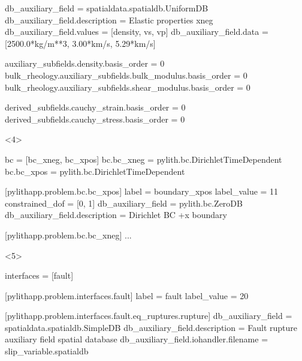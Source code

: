\documentclass[aspectratio=169]{beamer}
\begin{document}
\begin{frame}[t,fragile]
\begin{minipage}[t]{0.60\textwidth}
\begin{onlyenv}
\begin{cfgcode}
        db_auxiliary_field = spatialdata.spatialdb.UniformDB
        db_auxiliary_field.description = Elastic properties xneg
        db_auxiliary_field.values = [density, vs, vp]
        db_auxiliary_field.data = [2500.0*kg/m**3, 3.00*km/s, 5.29*km/s]

        auxiliary_subfields.density.basis_order = 0
        bulk_rheology.auxiliary_subfields.bulk_modulus.basis_order = 0
        bulk_rheology.auxiliary_subfields.shear_modulus.basis_order = 0

        derived_subfields.cauchy_strain.basis_order = 0
        derived_subfields.cauchy_stress.basis_order = 0
      \end{cfgcode}
    \end{onlyenv}
    \begin{onlyenv}<4>
      \begin{cfgcode}
        bc = [bc_xneg, bc_xpos]
        bc.bc_xneg = pylith.bc.DirichletTimeDependent
        bc.bc_xpos = pylith.bc.DirichletTimeDependent
        
        [pylithapp.problem.bc.bc_xpos]
        label = boundary_xpos
        label_value = 11
        constrained_dof = [0, 1]
        db_auxiliary_field = pylith.bc.ZeroDB
        db_auxiliary_field.description = Dirichlet BC +x boundary

        [pylithapp.problem.bc.bc_xneg]
        ...
      \end{cfgcode}
    \end{onlyenv}
    \begin{onlyenv}<5>
      \begin{cfgcode}
        interfaces = [fault]

        [pylithapp.problem.interfaces.fault]
        label = fault
        label_value = 20

        [pylithapp.problem.interfaces.fault.eq_ruptures.rupture]
        db_auxiliary_field = spatialdata.spatialdb.SimpleDB
        db_auxiliary_field.description = Fault rupture auxiliary field spatial database
        db_auxiliary_field.iohandler.filename = slip_variable.spatialdb
      \end{cfgcode}
    \end{onlyenv}
  \end{minipage}

  
\end{frame}
\end{document}
